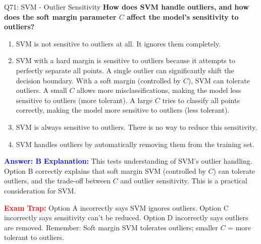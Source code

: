 \documentclass[8pt]{beamer}
\begin{document}
	\begin{frame}{Q71: SVM - Outlier Sensitivity}
		\fontsize{6.5}{7.5}\selectfont
		\textbf{How does SVM handle outliers, and how does the soft margin parameter $C$ affect the model's sensitivity to outliers?}
		
		\begin{enumerate}
			\item SVM is not sensitive to outliers at all. It ignores them completely.
			\item SVM with a hard margin is sensitive to outliers because it attempts to perfectly separate all points. A single outlier can significantly shift the decision boundary. With a soft margin (controlled by $C$), SVM can tolerate outliers. A small $C$ allows more misclassifications, making the model less sensitive to outliers (more tolerant). A large $C$ tries to classify all points correctly, making the model more sensitive to outliers (less tolerant).
			\item SVM is always sensitive to outliers. There is no way to reduce this sensitivity.
			\item SVM handles outliers by automatically removing them from the training set.
		\end{enumerate}
		
		\vspace{0.1cm}
		\textcolor{blue}{\textbf{Answer: B}}
		\vspace{0.1cm}
		\textcolor{blue}{\textbf{Explanation:}} This tests understanding of SVM's outlier handling. Option B correctly explains that soft margin SVM (controlled by $C$) can tolerate outliers, and the trade-off between $C$ and outlier sensitivity. This is a practical consideration for SVM.
		
		\textcolor{red}{\textbf{Exam Trap:}} Option A incorrectly says SVM ignores outliers. Option C incorrectly says sensitivity can't be reduced. Option D incorrectly says outliers are removed. Remember: Soft margin SVM tolerates outliers; smaller $C$ = more tolerant to outliers.
	\end{frame}
	
\end{document}

